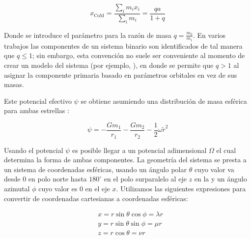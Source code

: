 \begin{eqfloat}[!ht]
	\centering
	\begin{equation}
		x_{\textrm{CoM}} = \frac{\sum_{i}{m_i x_i}}{\sum_{i}{m_i}} = \frac{qa}{1 + q}
	\end{equation}
	\blankcaption
	\label{ecuacionCentroDeMasa}
\end{eqfloat}

Donde se introduce el parámetro para la razón de masa $q = \frac{m_2}{m_1}$. En
varios trabajos las componentes de un sistema binario son identificados de tal
manera que $q \leq 1$; sin embargo, esta convención no suele ser conveniente al
momento de crear un modelo del sistema (por ejemplo,
\autocite{ding_fast_derivation_cbs_params_2022}), en donde se permite que $q >
1$ al asignar la componente primaria basado en parámetros orbitales en vez de
sus masas.

Este potencial efectivo $\psi$ se obtiene asumiendo una distribución de masa
esférica para ambas estrellas :

\begin{eqfloat}[!ht]
	\centering
	\begin{equation}
		\psi = -\frac{G m_1}{r_1} - \frac{G m_2}{r_2} - \frac{1}{2} \omega \tilde{r}^2
	\end{equation}
	\blankcaption
	\label{ecuacionPotencialEfectivo}
\end{eqfloat}

Usando el potencial $\psi$ es posible llegar a un potencial adimensional
$\Omega$ el cual determina la forma de ambas componentes. La geometría del
sistema se presta a un sistema de coordenadas esféricas, usando un ángulo polar
$\theta$ cuyo valor va desde $0$ en polo norte hasta $180^{\circ}$ en el polo
sur\textemdash paralelo al eje $z$ en la
\textemdash y un ángulo azimutal $\phi$ cuyo valor
es $0$ en el eje $x$. Utilizamos las siguientes expresiones para convertir de
coordenadas cartesianas a coordenadas esféricas:

\begin{eqfloat}[!ht]
	\centering
	\begin{equation}
		\begin{split}
			& x = r \sin{\theta} \cos{\phi} = \lambda r \\
			& y = r \sin{\theta} \sin{\phi} = \mu r \\
			& z = r \cos{\theta} = \nu r
		\end{split}
	\end{equation}
	\blankcaption
	\label{ecuacionesCoordsEsfericasConversion}
\end{eqfloat}

